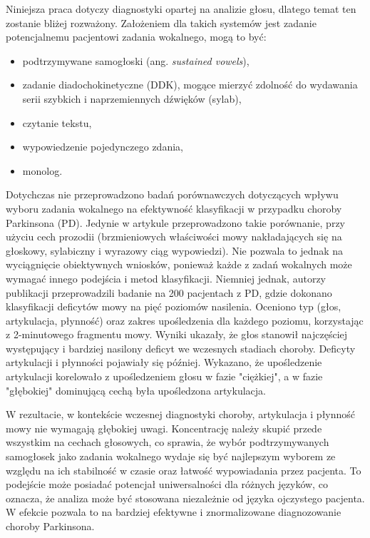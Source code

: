 Niniejsza praca dotyczy diagnostyki opartej na analizie głosu, dlatego temat ten zostanie bliżej rozważony.
Założeniem dla takich systemów jest zadanie potencjalnemu pacjentowi zadania wokalnego, mogą to być:
\begin{itemize}[itemsep=0.1pt]
	\item podtrzymywane samogłoski (ang. \emph{sustained vowels}),
	\item zadanie diadochokinetyczne (DDK), mogące mierzyć zdolność do wydawania serii szybkich i naprzemiennych dźwięków (sylab),
	\item czytanie tekstu,
	\item wypowiedzenie pojedynczego zdania,
	\item monolog.
\end{itemize}

Dotychczas nie przeprowadzono badań porównawczych dotyczących wpływu wyboru zadania wokalnego na efektywność klasyfikacji w przypadku choroby Parkinsona (PD).
Jedynie w artykule  \cite{vocal_task_comparision} przeprowadzono takie porównanie, przy użyciu cech prozodii (brzmieniowych
właściwości mowy nakładających się na głoskowy, sylabiczny i wyrazowy ciąg wypowiedzi).
Nie pozwala to jednak na wyciągnięcie obiektywnych wniosków, ponieważ każde z zadań wokalnych może wymagać innego podejścia i metod klasyfikacji.
Niemniej jednak, autorzy publikacji \cite{monitoring_speech} przeprowadzili badanie na 200 pacjentach z PD,
gdzie dokonano klasyfikacji deficytów mowy na pięć poziomów nasilenia.
Oceniono typ (głos, artykulacja, płynność) oraz zakres upośledzenia dla każdego poziomu, korzystając z 2-minutowego fragmentu mowy.
Wyniki ukazały, że głos stanowił najczęściej występujący i bardziej nasilony deficyt we wczesnych stadiach choroby.
Deficyty artykulacji i płynności pojawiały się później.
Wykazano, że upośledzenie artykulacji korelowało z upośledzeniem głosu w fazie "ciężkiej", a w fazie "głębokiej" dominującą cechą była upośledzona artykulacja.

W rezultacie, w kontekście wczesnej diagnostyki choroby, artykulacja i płynność mowy nie wymagają głębokiej uwagi.
Koncentrację należy skupić przede wszystkim na cechach głosowych, co sprawia, że wybór podtrzymywanych samogłosek jako zadania wokalnego
wydaje się być najlepszym wyborem ze względu na ich stabilność w czasie oraz łatwość wypowiadania przez pacjenta.
To podejście może posiadać potencjał uniwersalności dla różnych języków, co oznacza, że analiza może być stosowana
niezależnie od języka ojczystego pacjenta.
W efekcie pozwala to na bardziej efektywne i znormalizowane diagnozowanie choroby Parkinsona.

